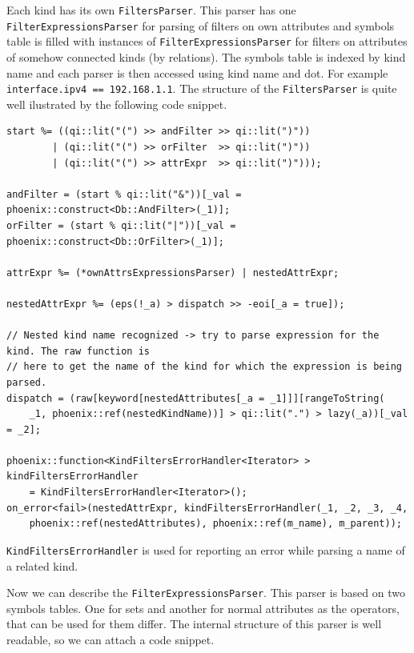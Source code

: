 \documentclass[deska]{subfiles}
\begin{document}
Each kind has its own {\tt FiltersParser}. This parser has one {\tt FilterExpressionsParser} for parsing of filters
on own attributes and symbols table is filled with instances of {\tt FilterExpressionsParser} for filters on attributes
of somehow connected kinds (by relations). The symbols table is indexed by kind name and each parser is then accessed
using kind name and dot. For example {\tt interface.ipv4 == 192.168.1.1}. The structure of the {\tt FiltersParser} is quite
well ilustrated by the following code snippet.

\begin{verbatim}
start %= ((qi::lit("(") >> andFilter >> qi::lit(")"))
        | (qi::lit("(") >> orFilter  >> qi::lit(")"))
        | (qi::lit("(") >> attrExpr  >> qi::lit(")")));

andFilter = (start % qi::lit("&"))[_val = phoenix::construct<Db::AndFilter>(_1)];
orFilter = (start % qi::lit("|"))[_val = phoenix::construct<Db::OrFilter>(_1)];

attrExpr %= (*ownAttrsExpressionsParser) | nestedAttrExpr;

nestedAttrExpr %= (eps(!_a) > dispatch >> -eoi[_a = true]);

// Nested kind name recognized -> try to parse expression for the kind. The raw function is
// here to get the name of the kind for which the expression is being parsed.
dispatch = (raw[keyword[nestedAttributes[_a = _1]]][rangeToString(
    _1, phoenix::ref(nestedKindName))] > qi::lit(".") > lazy(_a))[_val = _2];

phoenix::function<KindFiltersErrorHandler<Iterator> > kindFiltersErrorHandler
    = KindFiltersErrorHandler<Iterator>();
on_error<fail>(nestedAttrExpr, kindFiltersErrorHandler(_1, _2, _3, _4,
    phoenix::ref(nestedAttributes), phoenix::ref(m_name), m_parent));
\end{verbatim}

{\tt KindFiltersErrorHandler} is used for reporting an error while parsing a name of a related kind.

Now we can describe the {\tt FilterExpressionsParser}. This parser is based on two symbols tables. One for sets and another
for normal attributes as the operators, that can be used for them differ. The internal structure of this parser is well
readable, so we can attach a code snippet.
\end{document}

